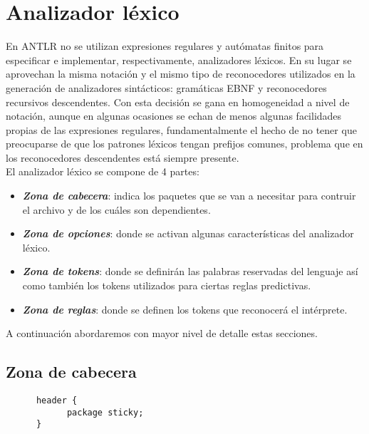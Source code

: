 \chapter{Analizador léxico}
En ANTLR no se utilizan expresiones regulares y autómatas finitos para especificar e implementar, respectivamente, analizadores
léxicos. En su lugar se aprovechan la misma notación y el mismo tipo de reconocedores utilizados en la generación de analizadores
sintácticos: gramáticas EBNF y reconocedores recursivos descendentes. Con esta decisión se gana en homogeneidad a nivel de notación,
aunque en algunas ocasiones se echan de menos algunas facilidades propias de las expresiones regulares, fundamentalmente el hecho de 
no tener que preocuparse de que los patrones léxicos tengan prefijos comunes, problema que en los reconocedores descendentes está 
siempre presente. \\

El analizador léxico se compone de 4 partes: 
\begin{itemize}
   \item \textbf{\textit{Zona de cabecera}}: indica los paquetes que se van a necesitar para contruir el archivo y de los cuáles son
         dependientes. 
   \item \textbf{\textit{Zona de opciones}}: donde se activan algunas características del analizador léxico. 
   \item \textbf{\textit{Zona de tokens}}: donde se definirán las palabras reservadas del lenguaje así como también los tokens 
         utilizados para ciertas reglas predictivas. 
   \item \textbf{\textit{Zona de reglas}}: donde se definen los tokens que reconocerá el intérprete.
\end{itemize}

A continuación abordaremos con mayor nivel de detalle estas secciones.\\

   \section{Zona de cabecera}
   \begin{lstlisting}
      header {
            package sticky;
      }
   \end{lstlisting}


